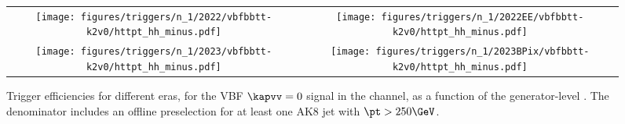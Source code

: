 
    \begin{figure}[H]
        \centering
        \begin{tabular}{cc}
            \texttt{[image: figures/triggers/n\_1/2022/vbfbbtt-k2v0/httpt\_hh\_minus.pdf]} &
            \texttt{[image: figures/triggers/n\_1/2022EE/vbfbbtt-k2v0/httpt\_hh\_minus.pdf]} \\[1ex]
            \texttt{[image: figures/triggers/n\_1/2023/vbfbbtt-k2v0/httpt\_hh\_minus.pdf]} &
            \texttt{[image: figures/triggers/n\_1/2023BPix/vbfbbtt-k2v0/httpt\_hh\_minus.pdf]}
            \label{fig}
        \end{tabular}
\caption{Trigger efficiencies for different eras, for the VBF \HHbbtt $\kapvv=0$ signal in the \tauhh channel, as a function of the generator-level \htata \pt. The denominator includes an offline preselection for at least one AK8 jet with $\pt > 250\GeV$.}
\label{fig:triggers_n-1_vbfbbtt-k2v0_hh_httpt}
\end{figure}
